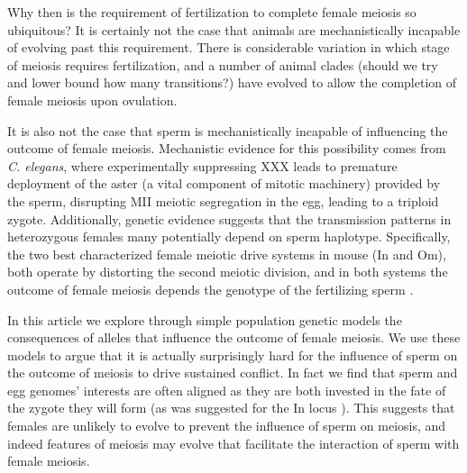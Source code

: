\documentclass[12pt,letterpaper]{article}
\begin{document}
Why then is the requirement of fertilization to complete female meiosis so ubiquitous? 
It is certainly not the case that animals are mechanistically incapable of evolving past this requirement.
There is considerable variation in which stage of meiosis requires fertilization, and 
a number of animal clades (should we try and lower bound how many transitions?) have evolved
to allow the completion of female meiosis upon ovulation. 

It is also not the case that sperm is mechanistically incapable of influencing the outcome of female meiosis.
Mechanistic evidence for this possibility comes from
\emph{C. elegans}, where experimentally suppressing XXX leads to
premature deployment of the aster (a vital component of mitotic
machinery) provided by the sperm, disrupting MII meiotic segregation in the egg, leading to a triploid zygote. 
Additionally, genetic evidence suggests that the transmission patterns
in heterozygous females many potentially depend on sperm haplotype. 
Specifically, the two best characterized female meiotic drive systems in mouse (In and Om), both operate by distorting the second meiotic division, 
and in both systems the outcome of female meiosis depends the genotype of the fertilizing sperm \citep{Agulnik1993,Wu2005}. 


In this article we explore through simple population genetic models the consequences of alleles that influence the outcome 
of female meiosis. 
We use these models to argue that it is actually surprisingly hard for the influence of
sperm on the outcome of meiosis to drive sustained conflict. In fact we find that sperm and egg 
genomes' interests are often aligned as they are both invested in the fate of the zygote they will form (as was suggested for the In locus \citep{Pomiankowski1993}).
This suggests that females are unlikely to evolve to prevent the influence of sperm on meiosis,
and indeed features of meiosis may evolve that facilitate the interaction of sperm with female meiosis. 
\end{document}
